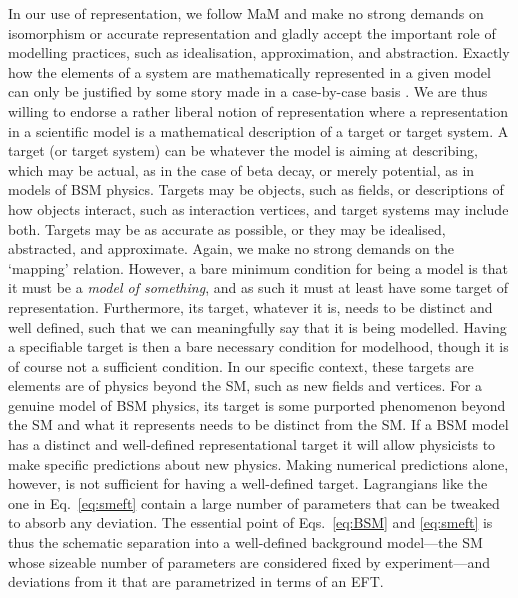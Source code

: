 In our use of representation, we follow MaM and make no strong demands on isomorphism or accurate representation and gladly accept the important role of modelling practices, such as idealisation, approximation, and abstraction. 
Exactly how the elements of a system are mathematically represented in a given model can only be justified by some story made in a case-by-case basis \citep[cf.~]{hartmann1999}. 
We are thus willing to endorse a rather liberal notion of representation where a representation in a scientific model is a mathematical description of a target or target system. 
A target (or target system) can be whatever the model is aiming at describing, which may be actual, as in the case of beta decay, or merely potential, as in models of BSM physics. 
Targets may be objects, such as fields, or descriptions of how objects interact, such as interaction vertices, and target systems may include both. 
Targets may be as accurate as possible, or they may be idealised, abstracted, and approximate. 
Again, we make no strong demands on the `mapping' relation. However, a bare minimum condition for being a model is that it must be a \textit{model of something}, and as such it must at least have some target of representation. 
Furthermore, its target, whatever it is, needs to be distinct and well defined, such that we can meaningfully say that it is being modelled.
Having a specifiable target is then a bare necessary condition for modelhood, though it is of course not a sufficient condition.
In our specific context, these targets are elements are of physics beyond the SM, such as new fields and vertices.
For a genuine model of BSM physics, its target is some purported phenomenon beyond the SM and what it represents needs to be distinct from the SM. 
If a BSM model has a distinct and well-defined representational target it will allow physicists to make specific predictions about new physics.
Making numerical predictions alone, however, is not sufficient for having a well-defined target. 
Lagrangians like the one in Eq.~\ref{eq:smeft} contain a large number of parameters that can be tweaked to absorb any deviation. 
The essential point of Eqs.~\ref{eq:BSM} and \ref{eq:smeft} is thus the schematic separation into a well-defined background model---the SM whose sizeable number of parameters are considered fixed by experiment---and deviations from it that are parametrized in terms of an EFT.

